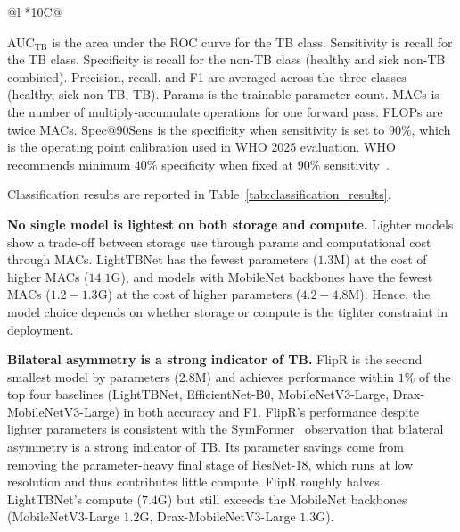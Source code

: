 \documentclass[conference, letterpaper]{IEEEtran}
\begin{document}
\begin{table}[!t]
\begin{threeparttable}
\begin{tabularx}{\textwidth}{@{}l *{10}{C}@{}}
\bottomrule
\end{tabularx}
\begin{tablenotes}[flushleft]
\footnotesize
\item AUC$_{\text{TB}}$ is the area under the ROC curve for the TB class. Sensitivity is recall for the TB class. Specificity is recall for the non-TB class (healthy and sick non-TB combined). Precision, recall, and F1 are averaged across the three classes (healthy, sick non-TB, TB). Params is the trainable parameter count. MACs is the number of multiply-accumulate operations for one forward pass. FLOPs are twice MACs. Spec@90Sens is the specificity when sensitivity is set to $90\%$, which is the operating point calibration used in WHO 2025 evaluation. WHO recommends minimum $40\%$ specificity when fixed at $90\%$ sensitivity~\cite{who_cad_approval_2025}.
\end{tablenotes}
\end{threeparttable}
\end{table}


Classification results are reported in Table~\ref{tab:classification_results}.

\textbf{No single model is lightest on both storage and compute.} Lighter models show a trade-off between storage use through params and computational cost through MACs. LightTBNet has the fewest parameters ($1.3$M) at the cost of higher MACs ($14.1$G), and models with MobileNet backbones have the fewest MACs ($1.2-1.3$G) at the cost of higher parameters ($4.2-4.8$M). Hence, the model choice depends on whether storage or compute is the tighter constraint in deployment.

\textbf{Bilateral asymmetry is a strong indicator of TB.}
FlipR is the second smallest model by parameters ($2.8$M) and achieves performance within $1\%$ of the top four baselines (LightTBNet, EfficientNet-B0, MobileNetV3-Large, Drax-MobileNetV3-Large) in both accuracy and F1. FlipR's performance despite lighter parameters is consistent with the SymFormer~\cite{liu2023tbx11k_pami} observation that bilateral asymmetry is a strong indicator of TB. Its parameter savings come from removing the parameter-heavy final stage of ResNet-18, which runs at low resolution and thus contributes little compute. FlipR roughly halves LightTBNet's compute ($7.4$G) but still exceeds the MobileNet backbones (MobileNetV3-Large $1.2$G, Drax-MobileNetV3-Large $1.3$G).
\end{document}
